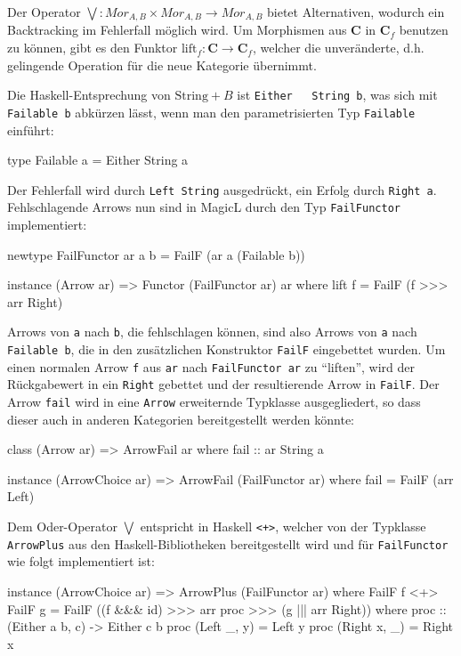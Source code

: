 \documentclass[11pt, a4paper, bibgerm]{scrbook}
\newcommand\icode[1]{\lstinline?#1?}
\newcommand\ato{\rightarrow} %
\begin{document}
Der Operator $\bigvee : Mor_{A,B} \times Mor_{A,B}
\rightarrow Mor_{A,B} $ bietet Alternativen, wodurch ein Backtracking im
Fehlerfall möglich wird. Um Morphismen aus
$\mathbf{C}$ in $\mathbf{C}_f$ benutzen zu können, gibt es den Funktor
$\mathrm{lift}_f:\mathbf{C} \ato \mathbf{C}_f$, welcher die
unveränderte, d.h. gelingende Operation für die neue Kategorie
übernimmt.

Die Haskell-Entsprechung von $\mathrm{String}+B$ ist \icode{Either
  String b}, was sich mit \icode{Failable b} abkürzen lässt, wenn man
den parametrisierten Typ \icode{Failable} einführt:

\begin{code}
type Failable a = Either String a
\end{code}

Der Fehlerfall wird durch \icode{Left String} ausgedrückt, ein Erfolg
durch \icode{Right a}. Fehlschlagende Arrows nun sind in MagicL durch den
Typ \icode{FailFunctor} implementiert:

\begin{code}
newtype FailFunctor ar a b = FailF (ar a (Failable b))

instance (Arrow ar) => Functor (FailFunctor ar) ar where
    lift f = FailF (f >>> arr Right)
\end{code} %

Arrows von \icode{a} nach \icode{b}, die fehlschlagen können, sind also
Arrows von \icode{a} nach \icode{Failable b}, die in den zusätzlichen
Konstruktor \icode{FailF} eingebettet wurden. Um einen normalen Arrow
\icode{f} aus \icode{ar} nach \icode{FailFunctor ar} zu "`liften"', wird
der Rückgabewert in ein \icode{Right} gebettet und der resultierende
Arrow in \icode{FailF}.
Der Arrow \icode{fail} wird in eine \icode{Arrow} erweiternde Typklasse
ausgegliedert, so dass dieser auch in anderen Kategorien bereitgestellt
werden könnte:

\begin{code}
class (Arrow ar) => ArrowFail ar where
  fail :: ar String a

instance (ArrowChoice ar) => ArrowFail (FailFunctor ar) where
  fail = FailF (arr Left)
\end{code}

Dem Oder-Operator $\bigvee$ entspricht in Haskell \icode{<+>}, welcher
von der Typklasse \icode{ArrowPlus} aus den Haskell-Bibliotheken
bereitgestellt wird und für \icode{FailFunctor} wie folgt implementiert
ist:

\begin{code}
instance (ArrowChoice ar) => ArrowPlus (FailFunctor ar) where
  FailF f <+> FailF g = FailF ((f &&& id) >>> arr proc >>> (g ||| arr Right))
   where proc :: (Either a b, c) -> Either c b
         proc (Left  _, y) = Left y
         proc (Right x, _) = Right x
\end{code} %
\end{document}
